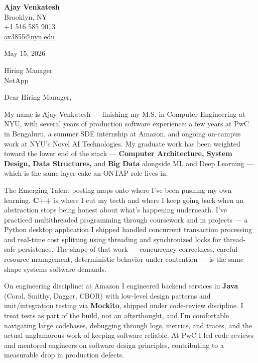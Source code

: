 \documentclass[letterpaper,11pt]{article}
\begin{document}
\begin{flushleft}
\textbf{\large Ajay Venkatesh} \\
Brooklyn, NY \\
+1 516 585 9013 \\
\href{mailto:av3855@nyu.edu}{av3855@nyu.edu}
\end{flushleft}

\vspace{10pt}

May 15, 2026

\vspace{6pt}

Hiring Manager \\
NetApp

\vspace{10pt}

Dear Hiring Manager,

My name is Ajay Venkatesh --- finishing my M.S. in Computer Engineering at NYU, with several years of production software experience: a few years at PwC in Bengaluru, a summer SDE internship at Amazon, and ongoing on-campus work at NYU's Novel AI Technologies. My graduate work has been weighted toward the lower end of the stack --- \textbf{Computer Architecture, System Design, Data Structures,} and \textbf{Big Data} alongside ML and Deep Learning --- which is the same layer-cake an ONTAP role lives in.

The Emerging Talent posting maps onto where I've been pushing my own learning. \textbf{C++} is where I cut my teeth and where I keep going back when an abstraction stops being honest about what's happening underneath. I've practiced multithreaded programming through coursework and in projects --- a Python desktop application I shipped handled concurrent transaction processing and real-time cost splitting using threading and synchronized locks for thread-safe persistence. The shape of that work --- concurrency correctness, careful resource management, deterministic behavior under contention --- is the same shape systems software demands.

On engineering discipline: at Amazon I engineered backend services in \textbf{Java} (Coral, Smithy, Dagger, CBOR) with low-level design patterns and unit/integration testing via \textbf{Mockito}, shipped under code-review discipline. I treat tests as part of the build, not an afterthought, and I'm comfortable navigating large codebases, debugging through logs, metrics, and traces, and the actual unglamorous work of keeping software reliable. At PwC I led code reviews and mentored engineers on software design principles, contributing to a measurable drop in production defects.
\end{document}
